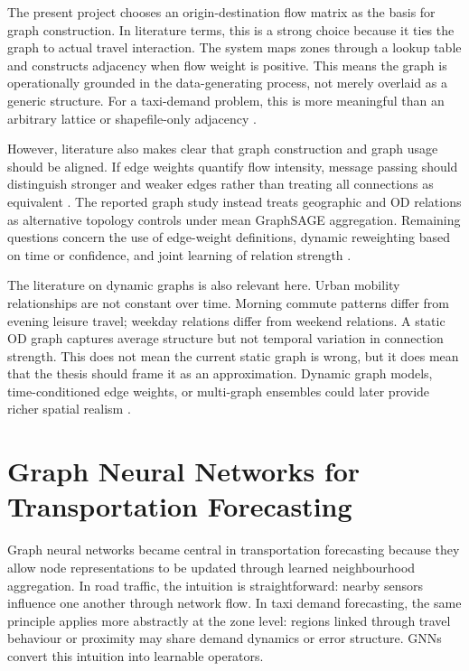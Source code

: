\documentclass[12pt,a4paper]{report}
\begin{document}
The present project chooses an origin-destination flow matrix as the basis for graph construction. In literature terms, this is a strong choice because it ties the graph to actual travel interaction. The system maps zones through a lookup table and constructs adjacency when flow weight is positive. This means the graph is operationally grounded in the data-generating process, not merely overlaid as a generic structure. For a taxi-demand problem, this is more meaningful than an arbitrary lattice or shapefile-only adjacency \cite{ke2021od}.

However, literature also makes clear that graph construction and graph usage should be aligned. If edge weights quantify flow intensity, message passing should distinguish stronger and weaker edges rather than treating all connections as equivalent \cite{jiang2022survey,west2025weighted}. The reported graph study instead treats geographic and OD relations as alternative topology controls under mean GraphSAGE aggregation. Remaining questions concern the use of edge-weight definitions, dynamic reweighting based on time or confidence, and joint learning of relation strength \cite{jiang2022survey,timegnn2023,dgcntraffic2020}.

The literature on dynamic graphs is also relevant here. Urban mobility relationships are not constant over time. Morning commute patterns differ from evening leisure travel; weekday relations differ from weekend relations. A static OD graph captures average structure but not temporal variation in connection strength. This does not mean the current static graph is wrong, but it does mean that the thesis should frame it as an approximation. Dynamic graph models, time-conditioned edge weights, or multi-graph ensembles could later provide richer spatial realism \cite{dynamicgnnsurvey2024,dgcntraffic2020,timegnn2023}.
\section{Graph Neural Networks for Transportation Forecasting}

Graph neural networks became central in transportation forecasting because they allow node representations to be updated through learned neighbourhood aggregation. In road traffic, the intuition is straightforward: nearby sensors influence one another through network flow. In taxi demand forecasting, the same principle applies more abstractly at the zone level: regions linked through travel behaviour or proximity may share demand dynamics or error structure. GNNs convert this intuition into learnable operators.
\end{document}
